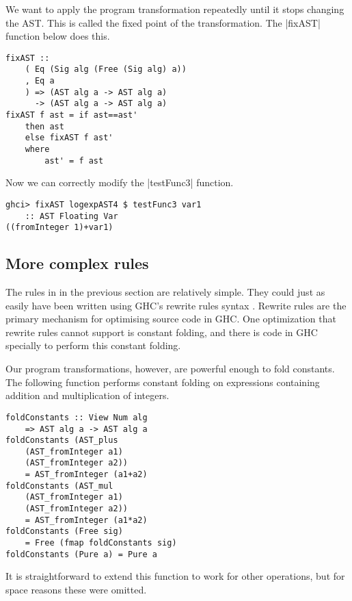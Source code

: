 \documentclass[preprint]{sigplanconf}
\theoremstyle{definition}
\begin{document}
We want to apply the program transformation repeatedly until it stops changing the AST.
This is called the fixed point of the transformation.
The |fixAST| function below does this.
\begin{lstlisting}
fixAST ::
    ( Eq (Sig alg (Free (Sig alg) a))
    , Eq a
    ) => (AST alg a -> AST alg a)
      -> (AST alg a -> AST alg a)
fixAST f ast = if ast==ast'
    then ast
    else fixAST f ast'
    where
        ast' = f ast
\end{lstlisting}
Now we can correctly modify the |testFunc3| function.
\begin{lstlisting}
ghci> fixAST logexpAST4 $ testFunc3 var1
    :: AST Floating Var
((fromInteger 1)+var1)
\end{lstlisting}

\subsection{More complex rules}

The rules in in the previous section are relatively simple.
They could just as easily have been written using GHC's rewrite rules syntax \cite{jones2001playing}.
Rewrite rules are the primary mechanism for optimising source code in GHC.
One optimization that rewrite rules cannot support is constant folding,
and there is code in GHC specially to perform this constant folding.

Our program transformations, however, are powerful enough to fold constants.
The following function performs constant folding on expressions containing addition and multiplication of integers.
\begin{lstlisting}
foldConstants :: View Num alg
    => AST alg a -> AST alg a
foldConstants (AST_plus
    (AST_fromInteger a1)
    (AST_fromInteger a2))
    = AST_fromInteger (a1+a2)
foldConstants (AST_mul
    (AST_fromInteger a1)
    (AST_fromInteger a2))
    = AST_fromInteger (a1*a2)
foldConstants (Free sig)
    = Free (fmap foldConstants sig)
foldConstants (Pure a) = Pure a
\end{lstlisting}
It is straightforward to extend this function to work for other operations,
but for space reasons these were omitted.
\end{document}
